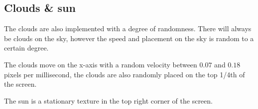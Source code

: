 \subsection{Clouds \& sun}

The clouds are also implemented with a degree of randomness. There will always be clouds on the sky, however the speed and placement on the sky is random to a certain degree. 

The clouds move on the x-axis with a random velocity between $0.07$ and $0.18$ pixels per millisecond, the clouds are also randomly placed on the top 1/4th of the screen. 

The sun is a stationary texture in the top right corner of the screen. 
